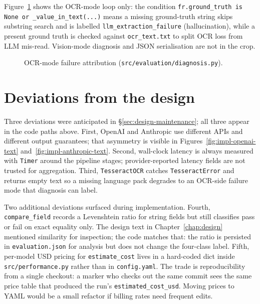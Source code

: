 Figure~\ref{fig:impl-diagnosis} shows the OCR-mode loop only: the
condition \texttt{fr.ground\_truth is None or \_value\_in\_text(...)}
means a missing ground-truth string skips substring search and is
labelled \texttt{llm\_extraction\_failure} (hallucination), while a
present ground truth is checked against \texttt{ocr\_text.txt} to
split OCR loss from LLM mis-read. Vision-mode diagnosis and JSON
serialisation are not in the crop.

\begin{figure}[ht]
    \centering
    \caption{OCR-mode failure attribution (\texttt{src/evaluation/diagnosis.py}).}
    \label{fig:impl-diagnosis}
\end{figure}


\section{Deviations from the design}
\label{sec:impl-deviations}

Three deviations were anticipated in
\S\ref{sec:design-maintenance}; all three appear in the code paths
above. First, OpenAI and Anthropic use different APIs and different
output guarantees; that asymmetry is visible in
Figures~\ref{fig:impl-openai-text} and~\ref{fig:impl-anthropic-text}.
Second, wall-clock latency is always measured with \texttt{Timer}
around the pipeline stages; provider-reported latency fields are
not trusted for aggregation. Third, \texttt{TesseractOCR} catches
\texttt{TesseractError} and returns empty text so a missing
language pack degrades to an OCR-side failure mode that diagnosis
can label.

Two additional deviations surfaced during implementation. Fourth,
\texttt{compare\_field} records a Levenshtein ratio for string
fields but still classifies pass or fail on exact equality only.
The design text in Chapter~\ref{chap:design} mentioned similarity
for inspection; the code matches that: the ratio is persisted in
\texttt{evaluation.json} for analysis but does not change the
four-class label. Fifth, per-model USD pricing for
\texttt{estimate\_cost} lives in a hard-coded dict inside
\texttt{src/performance.py} rather than in \texttt{config.yaml}.
The trade is reproducibility from a single checkout: a marker who
checks out the same commit sees the same price table that produced
the run's \texttt{estimated\_cost\_usd}. Moving prices to YAML
would be a small refactor if billing rates need frequent edits.

